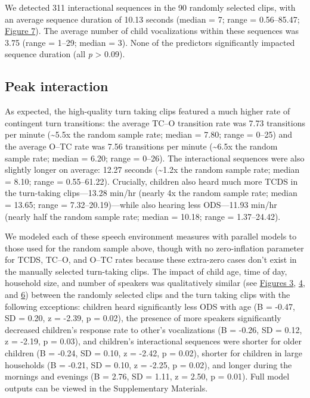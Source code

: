 \documentclass[floatsintext,man]{apa6}
\theoremstyle{definition}
\theoremstyle{definition}
\theoremstyle{definition}
\theoremstyle{remark}
\begin{document}
We detected 311 interactional sequences in the 90 randomly selected
clips, with an average sequence duration of 10.13 seconds (median = 7;
range = 0.56--85.47; \protect\hyperlink{fig7}{Figure 7}). The average
number of child vocalizations within these sequences was 3.75 (range =
1--29; median = 3). None of the predictors significantly impacted
sequence duration (all \emph{p} \textgreater{} 0.09).

\subsection{Peak interaction}\label{peak-interaction}

As expected, the high-quality turn taking clips featured a much higher
rate of contingent turn transitions: the average TC--O transition rate
was 7.73 transitions per minute (\textasciitilde{}5.5x the random sample
rate; median = 7.80; range = 0--25) and the average O--TC rate was 7.56
transitions per minute (\textasciitilde{}6.5x the random sample rate;
median = 6.20; range = 0--26). The interactional sequences were also
slightly longer on average: 12.27 seconds (\textasciitilde{}1.2x the
random sample rate; median = 8.10; range = 0.55--61.22). Crucially,
children also heard much more TCDS in the turn-taking clips---13.28
min/hr (nearly 4x the random sample rate; median = 13.65; range =
7.32--20.19)---while also hearing less ODS---11.93 min/hr (nearly half
the random sample rate; median = 10.18; range = 1.37--24.42).

We modeled each of these speech environment measures with parallel
models to those used for the random sample above, though with no
zero-inflation parameter for TCDS, TC--O, and O--TC rates because these
extra-zero cases don't exist in the manually selected turn-taking clips.
The impact of child age, time of day, household size, and number of
speakers was qualitatively similar (see \protect\hyperlink{fig3}{Figures
3}, \protect\hyperlink{fig4}{4}, and \protect\hyperlink{fig6}{6})
between the randomly selected clips and the turn taking clips with the
following exceptions: children heard significantly less ODS with age (B
= -0.47, SD = 0.20, z = -2.39, p = 0.02), the presence of more speakers
significantly decreased children's response rate to other's
vocalizations (B = -0.26, SD = 0.12, z = -2.19, p = 0.03), and
children's interactional sequences were shorter for older children (B =
-0.24, SD = 0.10, z = -2.42, p = 0.02), shorter for children in large
households (B = -0.21, SD = 0.10, z = -2.25, p = 0.02), and longer
during the mornings and evenings (B = 2.76, SD = 1.11, z = 2.50, p =
0.01). Full model outputs can be viewed in the Supplementary Materials.
\end{document}
